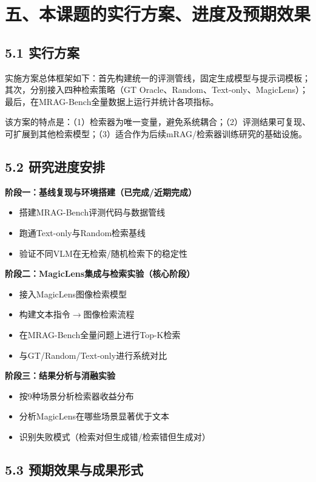 \documentclass[12pt,a4paper]{article}
\begin{document}
\section*{五、本课题的实行方案、进度及预期效果}

\subsection*{5.1 实行方案}

实施方案总体框架如下：首先构建统一的评测管线，固定生成模型与提示词模板；其次，分别接入四种检索策略（GT Oracle、Random、Text-only、MagicLens）；最后，在MRAG-Bench全量数据上运行并统计各项指标。

该方案的特点是：（1）检索器为唯一变量，避免系统耦合；（2）评测结果可复现、可扩展到其他检索模型；（3）适合作为后续mRAG/检索器训练研究的基础设施。

\subsection*{5.2 研究进度安排}

\textbf{阶段一：基线复现与环境搭建（已完成/近期完成）}
\begin{itemize}
\item 搭建MRAG-Bench评测代码与数据管线
\item 跑通Text-only与Random检索基线
\item 验证不同VLM在无检索/随机检索下的稳定性
\end{itemize}

\textbf{阶段二：MagicLens集成与检索实验（核心阶段）}
\begin{itemize}
\item 接入MagicLens图像检索模型\cite{zhang2024magiclens}
\item 构建文本指令$\rightarrow$图像检索流程
\item 在MRAG-Bench全量问题上进行Top-K检索
\item 与GT/Random/Text-only进行系统对比
\end{itemize}

\textbf{阶段三：结果分析与消融实验}
\begin{itemize}
\item 按9种场景分析检索器收益分布
\item 分析MagicLens在哪些场景显著优于文本
\item 识别失败模式（检索对但生成错/检索错但生成对）
\end{itemize}

\subsection*{5.3 预期效果与成果形式}
\end{document}
